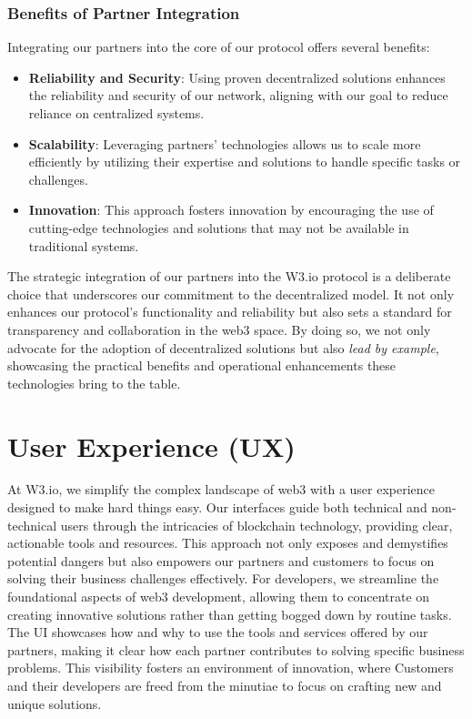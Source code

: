\documentclass[11pt]{article}
\begin{document}
\subsubsection*{Benefits of Partner Integration}
Integrating our partners into the core of our protocol offers several benefits:
\begin{itemize}
    \item \textbf{Reliability and Security}: Using proven decentralized solutions enhances the reliability and security of our network, aligning with our goal to reduce reliance on centralized systems.
    \item \textbf{Scalability}: Leveraging partners' technologies allows us to scale more efficiently by utilizing their expertise and solutions to handle specific tasks or challenges.
    \item \textbf{Innovation}: This approach fosters innovation by encouraging the use of cutting-edge technologies and solutions that may not be available in traditional systems.
\end{itemize}

The strategic integration of our partners into the W3.io protocol is a deliberate choice that underscores our commitment to the decentralized model. It not only enhances our protocol's functionality and reliability but also sets a standard for transparency and collaboration in the web3 space. By doing so, we not only advocate for the adoption of decentralized solutions but also \textit{lead by example}, showcasing the practical benefits and operational enhancements these technologies bring to the table. 

\section{User Experience (UX)}
At W3.io, we simplify the complex landscape of web3 with a user experience designed to make hard things easy. Our interfaces guide both technical and non-technical users through the intricacies of blockchain technology, providing clear, actionable tools and resources. This approach not only exposes and demystifies potential dangers but also empowers our partners and customers to focus on solving their business challenges effectively. For developers, we streamline the foundational aspects of web3 development, allowing them to concentrate on creating innovative solutions rather than getting bogged down by routine tasks. The UI showcases how and why to use the tools and services offered by our partners, making it clear how each partner contributes to solving specific business problems. This visibility fosters an environment of innovation, where Customers and their developers are freed from the minutiae to focus on crafting new and unique solutions.
 
\end{document}

